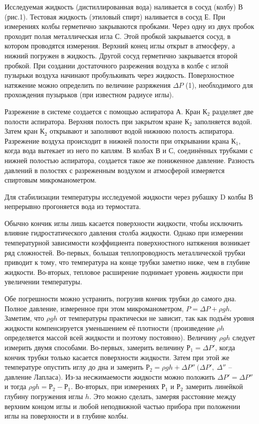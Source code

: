 \documentclass[12pt,a4paper]{article}
\begin{document}
Исследуемая жидкость (дистиллированная вода) наливается в сосуд (колбу) В (рис.1). Тестовая жидкость (этиловый спирт) наливается  в сосуд Е. При измерениях колбы герметично закрываются  пробками. Через одну из двух пробок проходит полая металлическая игла С. Этой пробкой закрывается сосуд, в котором проводятся измерения. Верхний конец иглы открыт в атмосферу, а нижний погружен в жидкость. Другой сосуд герметично закрывается второй пробкой. При создании достаточного разрежения воздуха в колбе с иглой пузырьки воздуха начинают пробулькивать через жидкость. Поверхностное натяжение можно определить по величине разряжения $\Delta P$ (1), необходимого для прохождения пузырьков (при известном радиусе иглы).

Разрежение в системе создается с помощью аспиратора А. Кран $К_2$ разделяет две полости аспиратора. Верхняя полость при закрытом кране $К_2$ заполняется водой. Затем кран $К_2$ открывают и заполняют водой нижнюю полость аспиратора. Разрежение воздуха происходит в нижней полости при открывании крана $К_1$, когда вода вытекает из него по каплям. В колбах В и С, соединённых трубками с нижней полостью аспиратора, создается такое же пониженное давление. Разность давлений в полостях с разреженным воздухом и атмосферой измеряется спиртовым микроманометром.

Для стабилизации температуры исследуемой жидкости через рубашку D колбы В непрерывно прогоняется вода из термостата.


Обычно кончик иглы лишь касается поверхности жидкости, чтобы исключить влияние гидростатического давления столба жидкости. Однако при измерении температурной зависимости коэффициента поверхностного натяжения возникает ряд сложностей. Во-первых, большая теплопроводность металлической трубки приводит к тому, что температура на конце трубки заметно ниже, чем в глубине жидкости. Во-вторых, тепловое расширение поднимает уровень жидкости при увеличении температуры. 

Обе погрешности можно устранить, погрузив кончик трубки до самого дна. Полное давление, измеренное при этом микроманометром, $P = \Delta P + \rho gh$. Заметим, что $\rho gh$ от температуры практически не зависит, так как подъём уровня жидкости компенсируется уменьшением её плотности (произведение $\rho h$ определяется массой всей жидкости и поэтому постоянно). Величину  $\rho gh$ следует измерить двумя способами. Во-первых, замерить величину $Р_1 = \Delta P'$, когда кончик трубки только касается поверхности жидкости. Затем при этой же температуре опустить иглу до дна и замерить $Р_2= \rho gh + \Delta P''\ (\Delta P',\ \Delta ''$ – давление Лапласа). Из-за  несжимаемости  жидкости можно положить $\Delta P'= \Delta P''$ и тогда $\rho gh = Р_2-Р_1$. Во-вторых, при измерениях $Р_1$ и $Р_2$ замерить линейкой глубину погружения иглы $h$. Это можно сделать, замеряя расстояние между верхним концом иглы и любой неподвижной частью прибора при положении иглы на поверхности и в глубине колбы.
\end{document}

